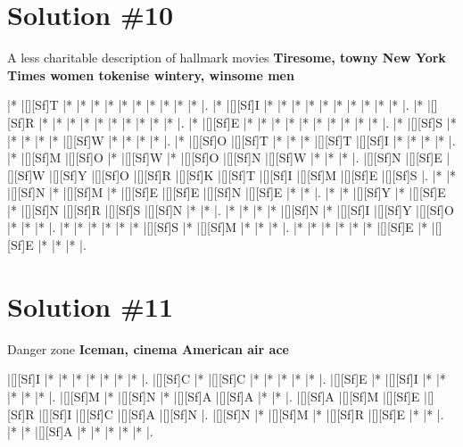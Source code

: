 \documentclass[letterpaper]{article}
\begin{document}
\newpage
\section*{Solution \#10}
A less charitable description of hallmark movies
\newline\textbf{Tiresome, towny New York Times women tokenise wintery, winsome men}

\vspace*{1em}
\begin{Puzzle}{12}{13}
|*        |[][Sf]T  |*        |*        |*        |*        |*        |*        |*        |*        |*        |*        |.
|*        |[][Sf]I  |*        |*        |*        |*        |*        |*        |*        |*        |*        |*        |.
|*        |[][Sf]R  |*        |*        |*        |*        |*        |*        |*        |*        |*        |*        |.
|*        |[][Sf]E  |*        |*        |*        |*        |*        |*        |*        |*        |*        |*        |.
|*        |[][Sf]S  |*        |*        |*        |*        |*        |[][Sf]W  |*        |*        |*        |*        |.
|*        |[][Sf]O  |[][Sf]T  |*        |*        |*        |[][Sf]T  |[][Sf]I  |*        |*        |*        |*        |.
|*        |[][Sf]M  |[][Sf]O  |*        |[][Sf]W  |*        |[][Sf]O  |[][Sf]N  |[][Sf]W   |*        |*        |*        |.
|[][Sf]N  |[][Sf]E  |[][Sf]W  |[][Sf]Y  |[][Sf]O  |[][Sf]R  |[][Sf]K  |[][Sf]T  |[][Sf]I  |[][Sf]M  |[][Sf]E  |[][Sf]S  |.
|*        |*        |[][Sf]N  |*        |[][Sf]M  |*        |[][Sf]E  |[][Sf]E  |[][Sf]N  |[][Sf]E  |*        |*        |.
|*        |*        |[][Sf]Y  |*        |[][Sf]E  |*        |[][Sf]N  |[][Sf]R  |[][Sf]S  |[][Sf]N  |*        |*        |.
|*        |*        |*        |*        |[][Sf]N  |*        |[][Sf]I  |[][Sf]Y  |[][Sf]O  |*        |*        |*        |.
|*        |*        |*        |*        |*        |*        |[][Sf]S  |*        |[][Sf]M  |*        |*        |*        |.
|*        |*        |*        |*        |*        |*        |[][Sf]E  |*        |[][Sf]E  |*        |*        |*        |.
\end{Puzzle}

\newpage
\section*{Solution \#11}
Danger zone
\newline\textbf{Iceman, cinema American air ace}

\vspace*{1em}
\begin{Puzzle}{8}{7}
|[][Sf]I  |*        |*        |*        |*        |*        |*        |*        |. 
|[][Sf]C  |*        |[][Sf]C  |*        |*        |*        |*        |*        |.  
|[][Sf]E  |*        |[][Sf]I  |*        |*        |*        |*        |*        |.
|[][Sf]M  |*        |[][Sf]N  |*        |[][Sf]A  |[][Sf]A  |*        |*        |.  
|[][Sf]A  |[][Sf]M  |[][Sf]E  |[][Sf]R  |[][Sf]I  |[][Sf]C  |[][Sf]A  |[][Sf]N  |.
|[][Sf]N  |*        |[][Sf]M  |*        |[][Sf]R  |[][Sf]E  |*        |*        |. 
|*        |*        |[][Sf]A  |*        |*        |*        |*        |*        |.
\end{Puzzle}
\end{document}
